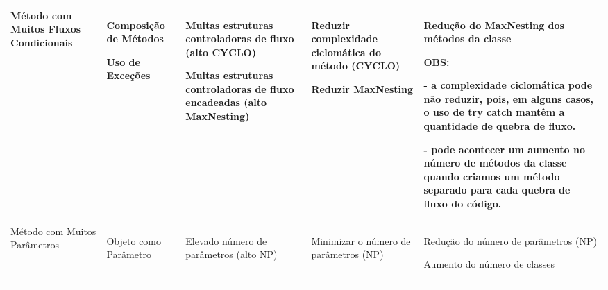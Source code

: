 \begin{landscape}
\begin{table}[hbt]
\begin{tabular}{|p{3cm}|p{4.5cm}|p{5.0cm}|p{5.5cm}|p{5.0cm}|}
\hline 
Método com Muitos Fluxos Condicionais                           
& \begin{my_itemize}
    \item Composição de Métodos
	\item Uso de Exceções
  \end{my_itemize}
& \begin{my_itemize}
	\item Muitas estruturas controladoras de fluxo (alto CYCLO)
	\item Muitas estruturas controladoras de fluxo encadeadas (alto MaxNesting)   
   \end{my_itemize}
& \begin{my_itemize}
	\item Reduzir complexidade ciclomática do método (CYCLO)
	\item Reduzir MaxNesting
  \end{my_itemize}
& \begin{my_itemize}
	\item Redução do MaxNesting dos métodos da classe
	\item OBS:
		\item[-] a complexidade ciclomática pode não reduzir, pois, em alguns casos, o uso de try catch mantêm a quantidade de quebra de fluxo.         
		\item[-] pode acontecer um aumento no número de métodos da classe quando criamos um método separado para cada quebra de fluxo do código.
  \end{my_itemize}
\tabularnewline                          
       
\hline 
Método com Muitos Parâmetros                         
& \begin{my_itemize}
    \item Objeto como Parâmetro
  \end{my_itemize}
& \begin{my_itemize}                            
    \item Elevado número de parâmetros (alto NP)
   \end{my_itemize}
& \begin{my_itemize}
	\item Minimizar o número de parâmetros (NP)
  \end{my_itemize}
& \begin{my_itemize}                           
	\item Redução do número de parâmetros (NP)
	\item Aumento do número de classes
  \end{my_itemize}
\tabularnewline                              


\end{tabular}
\end{table}
\end{landscape}
